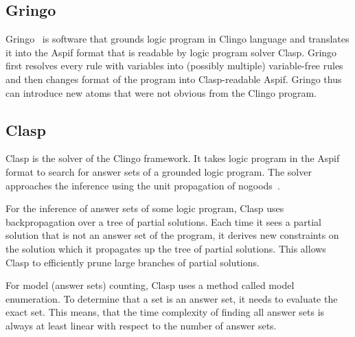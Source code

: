\subsection{Gringo}

Gringo~\cite{GebserKKS17} is software that grounds logic program in Clingo language
and translates it into the Aspif format that is readable by logic program solver Clasp.
Gringo first resolves every rule with variables
into (possibly multiple) variable-free rules and then changes format of
the program into Clasp-readable Aspif. Gringo thus can introduce new atoms
that were not obvious from the Clingo program.
\newcommand{\ms}{\texttt{ }}

\subsection{Clasp}\label{sec:clasp}

Clasp is the solver of the Clingo framework. It takes logic program in the Aspif
format to search for answer sets of a grounded logic program.
The solver approaches the inference using the unit propagation
of nogoods~\cite{DBLP:journals/ai/GebserKS12}.

For the inference of answer sets of some logic program,
Clasp uses backpropagation over a tree of partial solutions.
Each time it sees a partial solution that is not an answer set
of the program, it derives new constraints on the solution which it
propagates up the tree of partial solutions. This allows Clasp
to efficiently prune large branches of partial solutions.

For model (answer sets) counting, Clasp uses a method
called model enumeration. To determine that a set is an answer set,
it needs to evaluate the exact set.
This means, that the time complexity
of finding all answer sets is always at least linear with respect to the number of answer sets.
